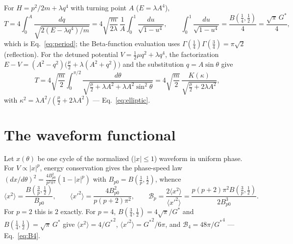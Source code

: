 \documentclass[11pt,a4paper]{article}
\newcommand{\Gstar}{{G^{*}}}
\begin{document}
For $H=p^{2}/2m+\lambda q^{4}$ with turning point $A$ ($E=\lambda A^{4}$),
\[
T=4\!\int_0^A\!\frac{dq}{\sqrt{2(E-\lambda q^4)/m}}
 =4\sqrt{\frac{m}{2\lambda}}\,\frac{1}{A}\int_0^1\!\frac{du}{\sqrt{1-u^4}},
\qquad
\int_0^1\!\frac{du}{\sqrt{1-u^4}}=\frac{B(\tfrac14,\tfrac12)}{4}
=\frac{\sqrt{\pi}\,\Gstar}{4},
\]
which is Eq.~\eqref{eq:period}; the Beta-function evaluation uses
$\Gamma(\tfrac14)\Gamma(\tfrac34)=\pi\sqrt2$ (reflection). For the detuned
potential $V=\tfrac12\mu q^{2}+\lambda q^{4}$, the factorization
$E-V=(A^{2}-q^{2})\bigl(\tfrac{\mu}{2}+\lambda(A^{2}+q^{2})\bigr)$ and the
substitution $q=A\sin\theta$ give
\[
T=4\sqrt{\frac m2}\int_0^{\pi/2}
\frac{d\theta}{\sqrt{\tfrac{\mu}{2}+\lambda A^{2}+\lambda A^{2}\sin^{2}\theta}}
=4\sqrt{\frac m2}\,
\frac{K(\kappa)}{\sqrt{\tfrac{\mu}{2}+2\lambda A^{2}}},
\]
with $\kappa^{2}=\lambda A^{2}/(\tfrac{\mu}{2}+2\lambda A^{2})$ ---
Eq.~\eqref{eq:elliptic}.

\section{The waveform functional}
\label{app:B}

Let $x(\theta)$ be one cycle of the normalized ($|x|\le1$) waveform in
uniform phase. For $V\propto|x|^{p}$, energy conservation gives the
phase-speed law $(dx/d\theta)^{2}=\tfrac{4B_{p0}^{2}}{p^{2}\pi^{2}}
(1-|x|^{p})$ with $B_{p0}=B(\tfrac1p,\tfrac12)$, whence
\[
\langle x^{2}\rangle=\frac{B(\tfrac3p,\tfrac12)}{B_{p0}},
\qquad
\langle x'^{2}\rangle=\frac{4B_{p0}^{2}}{p(p+2)\pi^{2}},
\qquad
\mathcal B_p=\frac{2\langle x^{2}\rangle}{\langle x'^{2}\rangle}
=\frac{p(p+2)\pi^{2}B(\tfrac3p,\tfrac12)}{2B_{p0}^{3}} .
\]
For $p=2$ this is $2$ exactly. For $p=4$, $B(\tfrac34,\tfrac12)=
4\sqrt{\pi}/\Gstar$ and $B(\tfrac14,\tfrac12)=\sqrt{\pi}\,\Gstar$ give
$\langle x^{2}\rangle=4/\Gstar^{2}$, $\langle x'^{2}\rangle=\Gstar^{2}/6\pi$,
and $\mathcal B_4=48\pi/\Gstar^{4}$ --- Eq.~\eqref{eq:B4}.
\end{document}

